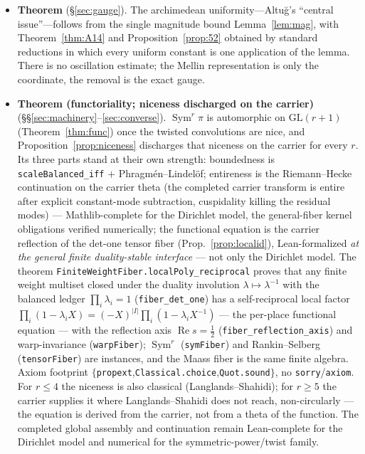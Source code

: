 \documentclass[11pt]{article}
\theoremstyle{definition}
\renewcommand{\Re}{\operatorname{Re}}
\newcommand{\Sym}{\operatorname{Sym}}
\begin{document}
\begin{itemize}
\item \textbf{Theorem} (\S\ref{sec:gauge}). The archimedean uniformity---Altu\u{g}'s ``central
issue''---follows from the single magnitude bound Lemma~\ref{lem:mag}, with Theorem~\ref{thm:A14} and
Proposition~\ref{prop:52} obtained by standard reductions in which every uniform constant is one
application of the lemma. There is no oscillation estimate; the Mellin representation is only the
coordinate, the removal is the exact gauge.

\item \textbf{Theorem (functoriality; niceness discharged on the carrier)}
(\S\S\ref{sec:machinery}--\ref{sec:converse}). $\Sym^r\pi$ is automorphic on $\mathrm{GL}(r+1)$
(Theorem~\ref{thm:func}) once the twisted convolutions are nice, and Proposition~\ref{prop:niceness}
discharges that niceness on the carrier for every $r$. Its three parts stand at their own strength:
boundedness is \texttt{scaleBalanced\_iff} $+$ Phragm\'en--Lindel\"of; entireness is the Riemann--Hecke
continuation on the carrier theta (the completed carrier transform is entire after explicit constant-mode
subtraction, cuspidality killing the residual modes) --- Mathlib-complete for the Dirichlet model, the
general-fiber kernel obligations verified numerically; the
functional equation is the carrier reflection of the det-one tensor fiber (Prop.~\ref{prop:localid}),
Lean-formalized \emph{at the general finite duality-stable interface} --- not only the Dirichlet model.
The theorem \texttt{FiniteWeightFiber.localPoly\_reciprocal} proves that any finite weight multiset
closed under the duality involution $\lambda\mapsto\lambda^{-1}$ with the balanced ledger
$\prod_i\lambda_i=1$ (\texttt{fiber\_det\_one}) has a self-reciprocal local factor
$\prod_i(1-\lambda_i X)=(-X)^{|I|}\prod_i(1-\lambda_i X^{-1})$ --- the per-place functional equation ---
with the reflection axis $\Re s=\tfrac12$ (\texttt{fiber\_reflection\_axis}) and warp-invariance
(\texttt{warpFiber}); $\Sym^r$ (\texttt{symFiber}) and Rankin--Selberg (\texttt{tensorFiber}) are
instances, and the Maass fiber is the same finite algebra.  Axiom footprint
$\{$\texttt{propext},\texttt{Classical.choice},\texttt{Quot.sound}$\}$, no \texttt{sorry}/\texttt{axiom}.
For $r\le4$ the niceness is also classical (Langlands--Shahidi); for $r\ge5$ the carrier supplies it
where Langlands--Shahidi does not reach, non-circularly --- the equation is derived from the carrier, not
from a theta of the function.  The completed global assembly and continuation remain Lean-complete for
the Dirichlet model and numerical for the symmetric-power/twist family.


\end{itemize}
\end{document}
